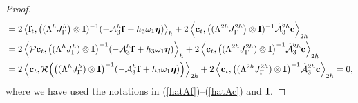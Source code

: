 \begin{proof}
\begin{align*}
& = 2\left<{\bf f}_t,\big(({\Lambda}^{h}{J}^h_\Gamma\big)\otimes {\bf I})^{-1}(-\mathcal{A}_3^h{\bf f}+h_3\omega_1{\bm \eta})\right>_{h}+ 2\left<{\bf c}_t,\big(({\Lambda}^{2h}{J}^{2h}_\Gamma\big)\otimes{\bf I})^{-1}\widetilde{\mathcal{A}}_3^{2h}{\bf c}\right>_{2h} \nonumber\\
& = 2\left<{\mathcal{P}}{\bf c}_t,\big(({\Lambda}^{h}{J}^h_\Gamma)\otimes{\bf I}\big)^{-1}(-\mathcal{A}_3^h{\bf f}+h_3\omega_1{\bm \eta})\right>_{h}+ 2\left<{\bf c}_t, \big(({\Lambda}^{2h}{J}^{2h}_\Gamma)\otimes{\bf I}\big)^{-1}\widetilde{\mathcal{A}}_3^{2h}{\bf c}\right>_{2h} \nonumber\\
& = 2\left<{\bf c}_t,{\mathcal{R}}\Big(\big(({\Lambda}^{h}{J}^h_\Gamma)\otimes{\bf I}\big)^{-1}(-\mathcal{A}_3^h{\bf f}+h_3\omega_1{\bm \eta})\Big)\right>_{2h}+ 2\left<{\bf c}_t,\big(({\Lambda}^{2h}{J}^{2h}_\Gamma)\otimes{\bf I}\big)^{-1}\widetilde{\mathcal{A}}_3^{2h}{\bf c}\right>_{2h} = 0,
\end{align*}
where we have used the notations in (\ref{hatAf})--(\ref{hatAc}) and ${\bf I}$.%
\end{proof}